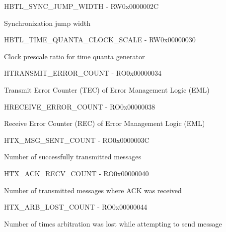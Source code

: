 \documentclass{article}
\begin{document}
\begin{register}{H}{BTL{\_}SYNC{\_}JUMP{\_}WIDTH - RW}{0x0000002C}  \par Synchronization jump width \regnewline
  \label{BTL_SYNC_JUMP_WIDTH}
\regnewline
\end{register}

\begin{register}{H}{BTL{\_}TIME{\_}QUANTA{\_}CLOCK{\_}SCALE - RW}{0x00000030}  \par Clock prescale ratio for time quanta generator \regnewline
  \label{BTL_TIME_QUANTA_CLOCK_SCALE}
\regnewline
\end{register}

\begin{register}{H}{TRANSMIT{\_}ERROR{\_}COUNT - RO}{0x00000034}  \par Transmit Error Counter (TEC) of Error Management Logic (EML) \regnewline
  \label{TRANSMIT_ERROR_COUNT}
\regnewline
\end{register}

\begin{register}{H}{RECEIVE{\_}ERROR{\_}COUNT - RO}{0x00000038}  \par Receive Error Counter (REC) of Error Management Logic (EML) \regnewline
  \label{RECEIVE_ERROR_COUNT}
\regnewline
\end{register}

\begin{register}{H}{TX{\_}MSG{\_}SENT{\_}COUNT - RO}{0x0000003C}  \par Number of successfully transmitted messages \regnewline
  \label{TX_MSG_SENT_COUNT}
\regnewline
\end{register}

\begin{register}{H}{TX{\_}ACK{\_}RECV{\_}COUNT - RO}{0x00000040}  \par Number of transmitted messages where ACK was received \regnewline
  \label{TX_ACK_RECV_COUNT}
\regnewline
\end{register}

\begin{register}{H}{TX{\_}ARB{\_}LOST{\_}COUNT - RO}{0x00000044}  \par Number of times arbitration was lost while attempting to send message \regnewline
  \label{TX_ARB_LOST_COUNT}
\regnewline
\end{register}
\end{document}
